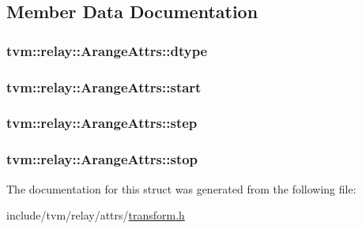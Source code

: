\subsection{Member Data Documentation}
\subsubsection[{\texorpdfstring{dtype}{dtype}}]{ tvm\+::relay\+::\+Arange\+Attrs\+::dtype}\hypertarget{structtvm_1_1relay_1_1ArangeAttrs_a405dbeb1c77da2690c40606c980f388d}{}\label{structtvm_1_1relay_1_1ArangeAttrs_a405dbeb1c77da2690c40606c980f388d}
\subsubsection[{\texorpdfstring{start}{start}}]{ tvm\+::relay\+::\+Arange\+Attrs\+::start}\hypertarget{structtvm_1_1relay_1_1ArangeAttrs_ae8ae5bc1551b406a4f52395af343c2ce}{}\label{structtvm_1_1relay_1_1ArangeAttrs_ae8ae5bc1551b406a4f52395af343c2ce}
\subsubsection[{\texorpdfstring{step}{step}}]{ tvm\+::relay\+::\+Arange\+Attrs\+::step}\hypertarget{structtvm_1_1relay_1_1ArangeAttrs_aabe51ead537f676d53ffedf91b16ae66}{}\label{structtvm_1_1relay_1_1ArangeAttrs_aabe51ead537f676d53ffedf91b16ae66}
\subsubsection[{\texorpdfstring{stop}{stop}}]{ tvm\+::relay\+::\+Arange\+Attrs\+::stop}\hypertarget{structtvm_1_1relay_1_1ArangeAttrs_a1eadf1f3964ca83dade8edeae7d6d7cf}{}\label{structtvm_1_1relay_1_1ArangeAttrs_a1eadf1f3964ca83dade8edeae7d6d7cf}


The documentation for this struct was generated from the following file\+:\begin{DoxyCompactItemize}
\item 
include/tvm/relay/attrs/\hyperlink{include_2tvm_2relay_2attrs_2transform_8h}{transform.\+h}\end{DoxyCompactItemize}
